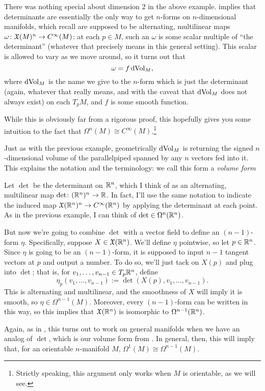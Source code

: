\begin{example}\label{ex:volume form}
	There was nothing special about dimension 2 in the above example.  implies that determinants are essentially the only way to get $n$-forms on $n$-dimensional manifolds, which recall are supposed to be alternating, multilinear maps $\omega \colon\thinspace\! \mathfrak{X}(M)^n \to C^\infty(M)$: at each $p\in M$, such an $\omega$ is some scalar multiple of ``the determinant'' (whatever that precisely means in this general setting). This scalar is allowed to vary as we move around, so it turns out that 
	\[
		\omega = f \operatorname{dVol}_M,
	\]
	where $\operatorname{dVol}_M$ is the name we give to the $n$-form which is just the determinant (again, whatever that really means, and with the caveat that $\operatorname{dVol}_M$ does not always exist) on each $T_pM$, and $f$ is some smooth function. 
	
	While this is obviously far from a rigorous proof, this hopefully gives you some intuition to the fact that $\Omega^n(M) \cong C^\infty(M)$.\footnote{Strictly speaking, this argument only works when $M$ is orientable, as we will see.}
	
	Just as with the previous example, geometrically $\operatorname{dVol}_M$ is returning the signed $n$-dimensional volume of the parallelpiped spanned by any $n$ vectors fed into it. This explains the notation and the terminology: we call this form a \emph{volume form}
\end{example}

\begin{example}\label{ex:n-1 forms}
	Let $\det$ be the determinant on $\mathbb{R}^n$, which I think of as an alternating, multilinear map $\det \colon\thinspace\! (\mathbb{R}^n)^n \to \mathbb{R}$. In fact, I'll use the same notation to indicate the induced map $\mathfrak{X}(\mathbb{R}^n)^n \to C^\infty(\mathbb{R}^n)$ by applying the determinant at each point. As in the previous example, I can think of $\det \in \Omega^n(\mathbb{R}^n)$.
	
	But now we're going to combine $\det$ with a vector field to define an $(n-1)$-form $\eta$. Specifically, suppose $X \in \mathfrak{X}(\mathbb{R}^n)$. We'll define $\eta$ pointwise, so let $p \in \mathbb{R}^n$. Since $\eta$ is going to be an $(n-1)$-form, it is supposed to input $n-1$ tangent vectors at $p$ and output a number. To do so, we'll just tack on $X(p)$ and plug into $\det$; that is, for $v_1, \dots , v_{n-1} \in T_p \mathbb{R}^n$, define
	\[
		\eta_p(v_1, \dots , v_{n-1}) := \det(X(p), v_1, \dots , v_{n-1}).
	\]
	This is alternating and multilinear, and the smoothness of $X$ will imply it is smooth, so $\eta \in \Omega^{n-1}(M)$. Moreover, every $(n-1)$-form can be written in this way, so this implies that $\mathfrak{X}(\mathbb{R}^n)$ is isomorphic to $\Omega^{n-1}(\mathbb{R}^n)$.
	
	Again, as in , this turns out to work on general manifolds when we have an analog of $\det$, which is our volume form from . In general, then, this will imply that, for an orientable $n$-manifold $M$, $\Omega^1(M) \cong \Omega^{n-1}(M)$.
\end{example}